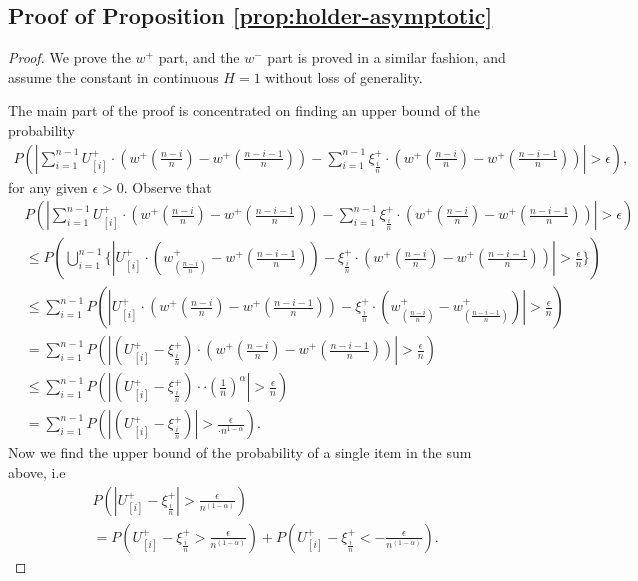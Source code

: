 \subsection*{Proof of Proposition \ref{prop:holder-asymptotic}}

\begin{proof}
We prove the $w^+$ part, and the $w^-$ part is proved in a similar fashion, and assume the constant in \holder continuous $H=1$ without loss of generality.

The main part of the proof is concentrated on finding an upper bound of the probability
\begin{align}
P ( \left| \sum_{i=1}^{n-1} U^+_{[i]} \cdot (w^+(\frac{n-i}{n} )  - w^+(\frac{n-i-1}{n} ) ) -
\sum_{i=1}^{n-1} \xi^+_{\frac{i}{n}} \cdot (w^+(\frac{n-i}{n} )  - w^+(\frac{n-i-1}{n} ) ) \right| >
\epsilon),
\end{align}
for any given $\epsilon>0$.
Observe that
\begin{align*}
& P ( \left| \sum_{i=1}^{n-1} U^+_{[i]} \cdot (w^+(\frac{n-i}{n} )  - w^+(\frac{n-i-1}{n} ) ) -
\sum_{i=1}^{n-1} \xi^+_{\frac{i}{n}} \cdot (w^+(\frac{n-i}{n} )  - w^+(\frac{n-i-1}{n} ) ) \right| >
\epsilon) \\ & \leq P ( \bigcup _{i=1}^{n-1} \{ \left| U^+_{[i]} \cdot (w^+_(\frac{n-i}{n}) -
w^+{(\frac{n-i-1}{n})}) - \xi^+_{\frac{i}{n}} \cdot (w^+(\frac{n-i}{n} )  - w^+(\frac{n-i-1}{n} ) )
\right| > \frac{\epsilon}{n} \}) \\ & \leq \sum _{i=1}^{n-1} P ( \left| U^+_{[i]} \cdot
(w^+(\frac{n-i}{n} )  - w^+(\frac{n-i-1}{n} ) ) - \xi^+_{\frac{i}{n}} \cdot (w^+_(\frac{n-i}{n}) -
w^+_(\frac{n-i-1}{n})) \right| > \frac{\epsilon}{n}) \\ & = \sum _{i=1}^{n-1} P ( \left| ( U^+_{[i]} -
\xi^+_{\frac{i}{n}}) \cdot (w^+(\frac{n-i}{n} )  - w^+(\frac{n-i-1}{n} ) ) \right| > \frac{\epsilon}{n})
\\ & \leq \sum _{i=1}^{n-1} P ( \left| ( U^+_{[i]} - \xi^+_{\frac{i}{n}}) \cdot \cdot (\frac{1}{n})^{\alpha}
\right| > \frac{\epsilon}{n}) \\ & = \sum _{i=1}^{n-1} P ( \left| ( U^+_{[i]} - \xi^+_{\frac{i}{n}})
\right| > \frac{\epsilon}{\cdot n^{1-\alpha}}).
\end{align*}
Now we find the upper bound of the probability of a single item in the sum above, i.e
\begin{align*}
& P( \left | U^+_{[i]} - \xi^+_{\frac{i}{n}} \right | > \frac {\epsilon} {n^{(1-\alpha)}}) \\ & = P (
    U^+_{[i]} - \xi^+_{\frac{i}{n}} > \frac {\epsilon} {n^{(1-\alpha)}}) + P ( U^+_{[i]} -
    \xi^+_{\frac{i}{n}} < - \frac {\epsilon} {n^{(1-\alpha)}}).
\end{align*} 


\end{proof}
